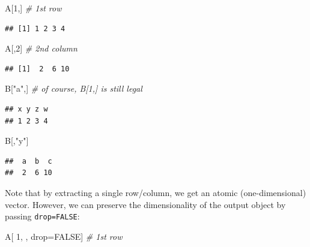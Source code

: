 \documentclass[10pt,b5paper,krantz1]{krantz}
\newenvironment{Shaded}{\begin{snugshade}}{\end{snugshade}}
\newcommand{\CommentTok}[1]{\textcolor[rgb]{0.37,0.37,0.37}{\textit{#1}}}
\newcommand{\DecValTok}[1]{\textcolor[rgb]{0.06,0.06,0.06}{#1}}
\newcommand{\NormalTok}[1]{#1}
\newcommand{\OtherTok}[1]{\textcolor[rgb]{0.37,0.37,0.37}{#1}}
\newcommand{\StringTok}[1]{\textcolor[rgb]{0.5,0.5,0.5}{#1}}
\begin{document}
\begin{Shaded}
\begin{Highlighting}[]
\NormalTok{A[}\DecValTok{1}\NormalTok{,] }\CommentTok{# 1st row}
\end{Highlighting}
\end{Shaded}

\begin{verbatim}
## [1] 1 2 3 4
\end{verbatim}

\begin{Shaded}
\begin{Highlighting}[]
\NormalTok{A[,}\DecValTok{2}\NormalTok{] }\CommentTok{# 2nd column}
\end{Highlighting}
\end{Shaded}

\begin{verbatim}
## [1]  2  6 10
\end{verbatim}

\begin{Shaded}
\begin{Highlighting}[]
\NormalTok{B[}\StringTok{"a"}\NormalTok{,] }\CommentTok{# of course, B[1,] is still legal}
\end{Highlighting}
\end{Shaded}

\begin{verbatim}
## x y z w 
## 1 2 3 4
\end{verbatim}

\begin{Shaded}
\begin{Highlighting}[]
\NormalTok{B[,}\StringTok{"y"}\NormalTok{]}
\end{Highlighting}
\end{Shaded}

\begin{verbatim}
##  a  b  c 
##  2  6 10
\end{verbatim}

Note that by extracting a single row/column, we get an atomic (one-dimensional)
vector. However, we can preserve the dimensionality of the output object
by passing \texttt{drop=FALSE}:

\begin{Shaded}
\begin{Highlighting}[]
\NormalTok{A[  }\DecValTok{1}\NormalTok{,    , drop=}\OtherTok{FALSE}\NormalTok{] }\CommentTok{# 1st row}
\end{Highlighting}
\end{Shaded}
\end{document}
